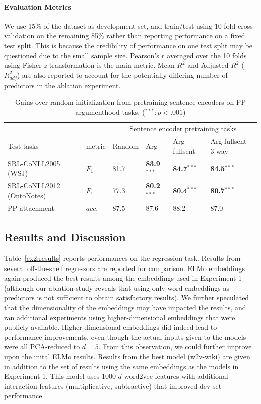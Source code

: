 \documentclass[letterpaper]{article} %
\begin{document}
\paragraph{Evaluation Metrics}
We use 15\% of the dataset as development set, and train/test using 10-fold cross-validation on the remaining 85\% rather than reporting performance on a fixed test split. This is because the credibility of performance on one test split may be questioned due to the small sample size. Pearson's $r$ averaged over the 10 folds using Fisher \textit{z}-transformation is the main metric. Mean $R^2$ and Adjusted $R^2$ ($R^2_{adj}$) are also reported to account for the potentially differing number of predictors in the ablation experiment.

\begin{table}[h]
\centering
\begin{tabular}{@{}l|l|llll@{}}
\toprule
& & \multicolumn{4}{c}{Sentence encoder pretraining tasks} \\
Test tasks & metric & Random & Arg & Arg fullsent & Arg fullsent 3-way \\ \midrule
SRL-CoNLL2005 (WSJ)  & $F_1$ &  81.7 & \textbf{83.9$^{***}$} & \textbf{84.7$^{***}$} & \textbf{84.5$^{***}$}  \\
SRL-CoNLL2012 (OntoNotes) & $F_1$  & 77.3 & \textbf{80.2$^{***}$} & \textbf{80.4$^{***}$} & \textbf{80.7$^{***}$} \\
PP attachment \cite{belinkov2014exploring} & $acc.$ & 87.5 & 87.6 & 88.2 & 87.0 \\
\bottomrule
\end{tabular}
\caption{\normalsize Gains over random initialization from pretraining sentence encoders on PP argumenthood tasks. ($^{***}: p<.001$)}
\label{exp:pretrain}
\end{table}

\subsection{Results and Discussion}

Table~\ref{ex2:results} reports performances on the regression task. Results from several off-the-shelf regressors are reported for comparison. ELMo embeddings again produced the best results among the embeddings used in Experiment 1 (although our ablation study reveals that using only word embeddings as predictors is not sufficient to obtain satisfactory results). We further speculated that the dimensionality of the embeddings may have impacted the results, and ran additional experiments using higher-dimensional embeddings that were publicly available. Higher-dimensional embeddings did indeed lead to performance improvements, even though the actual inputs given to the models were all PCA-reduced to $d=5$. From this observation, we could further improve upon the inital ELMo results. Results from the best model (w2v-wiki) are given in addition to the set of results using the same embeddings as the models in Experiment 1. This model uses 1000-$d$ word2vec features with additional interaction features (multiplicative, subtractive) that improved dev set performance.
\end{document}
